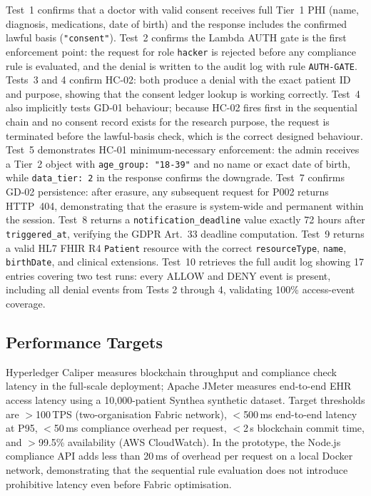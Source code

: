 \documentclass[10pt,twocolumn,a4paper]{article}
\begin{document}
Test~1 confirms that a doctor with valid consent receives full Tier~1
PHI (name, diagnosis, medications, date of birth) and the response
includes the confirmed lawful basis (\texttt{"consent"}). Test~2
confirms the Lambda AUTH gate is the first enforcement point: the
request for role \texttt{hacker} is rejected before any compliance
rule is evaluated, and the denial is written to the audit log with
rule \texttt{AUTH-GATE}. Tests~3 and 4 confirm HC-02: both produce
a denial with the exact patient ID and purpose, showing that the
consent ledger lookup is working correctly. Test~4 also implicitly
tests GD-01 behaviour; because HC-02 fires first in the sequential
chain and no consent record exists for the research purpose, the
request is terminated before the lawful-basis check, which is the
correct designed behaviour. Test~5 demonstrates HC-01
minimum-necessary enforcement: the admin receives a Tier~2 object
with \texttt{age\_group: "18-39"} and no name or exact date of birth,
while \texttt{data\_tier: 2} in the response confirms the downgrade.
Test~7 confirms GD-02 persistence: after erasure, any subsequent
request for P002 returns HTTP~404, demonstrating that the erasure
is system-wide and permanent within the session. Test~8 returns a
\texttt{notification\_deadline} value exactly 72 hours after
\texttt{triggered\_at}, verifying the GDPR Art.~33 deadline
computation. Test~9 returns a valid HL7 FHIR R4 \texttt{Patient}
resource with the correct \texttt{resourceType}, \texttt{name},
\texttt{birthDate}, and clinical extensions. Test~10 retrieves the
full audit log showing 17 entries covering two test runs: every
ALLOW and DENY event is present, including all denial events from
Tests 2 through 4, validating 100\% access-event coverage.

\subsection{Performance Targets}

Hyperledger Caliper measures blockchain throughput and compliance check
latency in the full-scale deployment; Apache JMeter measures end-to-end
EHR access latency using a 10,000-patient Synthea synthetic dataset.
Target thresholds are $>$100\,TPS (two-organisation Fabric network),
$<$500\,ms end-to-end latency at P95, $<$50\,ms compliance overhead per
request, $<$2\,s blockchain commit time, and $>$99.5\% availability (AWS
CloudWatch). In the prototype, the Node.js compliance API adds less than
20\,ms of overhead per request on a local Docker network, demonstrating
that the sequential rule evaluation does not introduce prohibitive latency
even before Fabric optimisation.
\end{document}
